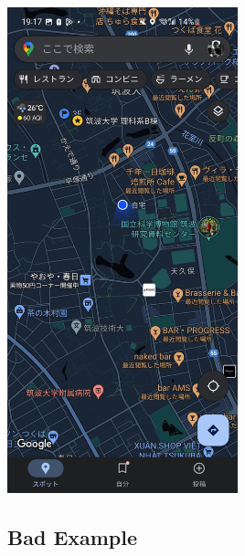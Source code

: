 \documentclass[12pt,a4paper]{article}
\begin{document}
\includegraphics[width=0.5\textwidth]{materials/Maps1.jpg}

\newpage

\subsection{Bad Example}
\end{document}
